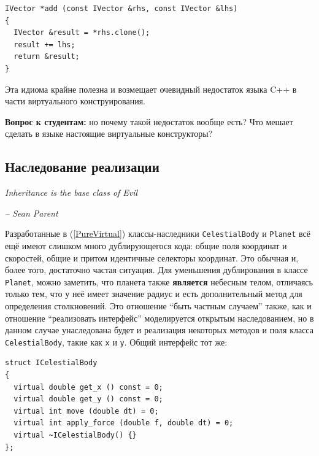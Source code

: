 \documentclass[a4paper,12pt,oneside]{article}
\newif\ifanswers
\begin{document}
\begin{lstlisting}
IVector *add (const IVector &rhs, const IVector &lhs)
{
  IVector &result = *rhs.clone();
  result += lhs;
  return &result;
}
\end{lstlisting}

Эта идиома крайне полезна и возмещает очевидный недостаток языка C++ в части виртуального конструирования.

\textbf{Вопрос к студентам:} но почему такой недостаток вообще есть? Что мешает сделать в языке настоящие виртуальные конструкторы?

\ifanswers
Правильный ответ: именно конструктор делает ту работу, которая должна быть сделана чтобы заработал механизм виртуальных функций. Поэтому в конструкторе класса виртуальные вызовы работают как не виртуальные. Поэтому даже если бы можно было сделать конструктор виртуальным, его вызов все равно был бы вызовом невиртуальной функции.
\fi

\pagebreak
\subsection{Наследование реализации}\label{ImplInheritance}

\hfill\textit{Inheritance is the base class of Evil} {\vspace{0.5em}}

\hfill\textit{-- Sean Parent}

Разработанные в (\ref{PureVirtual}) классы-наследники \lstinline!CelestialBody! и \lstinline!Planet! всё ещё имеют слишком много дублирующегося кода: общие поля координат и скоростей, общие и притом идентичные селекторы координат. Это обычная и, более того, достаточно частая ситуация. Для уменьшения дублирования в классе \lstinline!Planet!, можно заметить, что планета также \textbf{является} небесным телом, отличаясь только тем, что у неё имеет значение радиус и есть дополнительный метод для определения столкновений. Это отношение ``быть частным случаем'' также, как и отношение ``реализовать интерфейс'' моделируется открытым наследованием, но в данном случае унаследована будет и реализация некоторых методов и поля класса \lstinline!CelestialBody!, такие как \lstinline!x! и \lstinline!y!. Общий интерфейс тот же:

\begin{lstlisting}
struct ICelestialBody
{
  virtual double get_x () const = 0;
  virtual double get_y () const = 0;
  virtual int move (double dt) = 0;
  virtual int apply_force (double f, double dt) = 0;
  virtual ~ICelestialBody() {}
};
\end{lstlisting}
\end{document}
